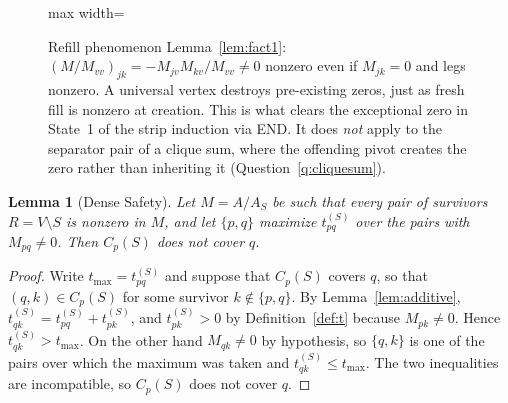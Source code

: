 \documentclass[11pt]{article}
\theoremstyle{plain}
\newtheorem{lemma}[theorem]{Lemma}
\theoremstyle{definition}
\theoremstyle{remark}
\begin{document}
\begin{humanaiblock}
\begin{figure}[H]
\centering
\begin{adjustbox}{max width=\textwidth}
\end{adjustbox}
\caption[The refill phenomenon]{Refill phenomenon Lemma~\ref{lem:fact1}: $(M/M_{vv})_{jk}=-M_{jv}M_{kv}/M_{vv}\neq0$ nonzero even if $M_{jk}=0$ and legs nonzero. A universal vertex destroys pre-existing zeros, just as fresh fill is nonzero at creation. This is
what clears the exceptional zero in State~1 of the strip induction via END. It does \emph{not} apply
to the separator pair of a clique sum, where the offending pivot creates the zero rather than
inheriting it (Question~\ref{q:cliquesum}).}
\label{fig:refill}
\end{figure}


\begin{lemma}[Dense Safety]\label{lem:dense}
Let $M=A/A_S$ be such that every pair of survivors $R=V\setminus S$ is nonzero in $M$, and let
$\{p,q\}$ maximize $t^{(S)}_{pq}$ over the pairs with $M_{pq}\neq0$. Then $C_p(S)$ does not cover $q$.
\end{lemma}

\begin{proof}
Write $t_{\max}=t^{(S)}_{pq}$ and suppose that $C_p(S)$ covers $q$, so that $(q,k)\in C_p(S)$ for some
survivor $k\notin\{p,q\}$. By Lemma~\ref{lem:additive},
$t^{(S)}_{qk}=t^{(S)}_{pq}+t^{(S)}_{pk}$, and $t^{(S)}_{pk}>0$ by Definition~\ref{def:t} because
$M_{pk}\neq0$. Hence $t^{(S)}_{qk}>t_{\max}$. On the other hand $M_{qk}\neq0$ by hypothesis, so
$\{q,k\}$ is one of the pairs over which the maximum was taken and $t^{(S)}_{qk}\le t_{\max}$. The two
inequalities are incompatible, so $C_p(S)$ does not cover $q$.
\end{proof}


\end{humanaiblock}
\end{document}
